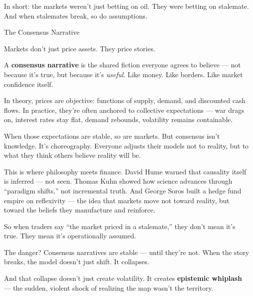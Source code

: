 In short: the markets weren't just betting on oil.
They were betting on stalemate.
And when stalemates break, so do assumptions.

\medskip

\begin{PhilosophicalSidebar}{The Consensus Narrative}

  Markets don’t just price assets.  
  They price stories.

  \medskip
  
  A \textbf{consensus narrative} is the shared fiction everyone agrees to believe — not because it's true, but because 
  it’s \textit{useful}.  Like money. Like borders. Like market confidence itself.
  
  \medskip

  In theory, prices are objective: functions of supply, demand, and discounted cash flows.  
  In practice, they’re often anchored to collective expectations — war drags on, interest rates stay flat, demand rebounds, 
  volatility remains containable.

  \medskip
  
  When those expectations are stable, so are markets.  
  But consensus isn’t knowledge. It’s choreography.  
  Everyone adjusts their models not to reality, but to what they think others believe reality will be.
  
  \medskip
  
  This is where philosophy meets finance.  
  David Hume warned that causality itself is inferred — not seen.  
  Thomas Kuhn showed how science advances through “paradigm shifts,” not incremental truth.  
  And George Soros built a hedge fund empire on reflexivity — the idea that markets move not toward reality, but toward the 
  beliefs they manufacture and reinforce.
  
  \medskip
  
  So when traders say “the market priced in a stalemate,” they don’t mean it’s true.  
  They mean it’s operationally assumed.

  \medskip
  
  The danger?  
  Consensus narratives are stable — until they’re not.  
  When the story breaks, the model doesn’t just shift.  
  It collapses.  

  \medskip
  
  And that collapse doesn’t just create volatility.  
  It creates \textbf{epistemic whiplash} — the sudden, violent shock of realizing the map wasn’t the territory.
  
\end{PhilosophicalSidebar}

